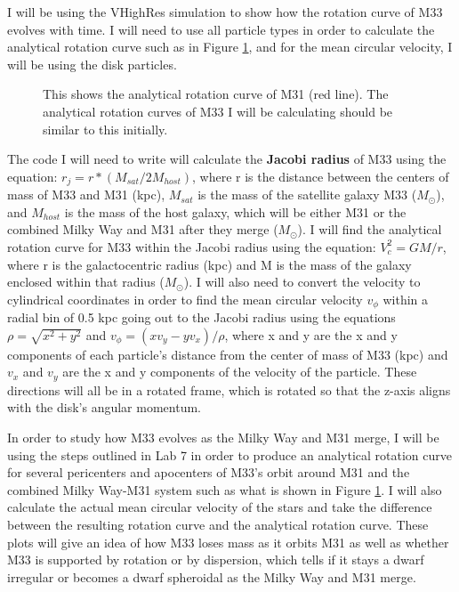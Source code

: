 \documentclass[trackchanges, twocolumn]{aastex7}
\begin{document}
I will be using the VHighRes simulation to show how the rotation curve of M33 evolves with time. I will need to use all particle types in order to calculate the analytical rotation curve such as in Figure \ref{fig:Lab7}, and for the mean circular velocity, I will be using the disk particles.

\begin{figure}[ht!]
\caption{ This shows the analytical rotation curve of M31 (red line). The analytical rotation curves of M33 I will be calculating should be similar to this initially.
\label{fig:Lab7}}
\end{figure}

The code I will need to write will calculate the \textbf{Jacobi radius} of M33 using the equation: 
\(r_j = r*(M_{sat}/2M_{host})\),
where r is the distance between the centers of mass of M33 and M31 (kpc), \(M_{sat}\) is the mass of the satellite galaxy M33 (\(M_\odot\)), and \(M_{host}\) is the mass of the host galaxy, which will be either M31 or the combined Milky Way and M31 after they merge (\(M_\odot\)). I will find the analytical rotation curve for M33 within the Jacobi radius using the equation:
\(V_c^2=GM/r\),
where r is the galactocentric radius (kpc) and M is the mass of the galaxy enclosed within that radius (\(M_\odot\)). I will also need to convert the velocity to cylindrical coordinates in order to find the mean circular velocity \(v_\phi\) within a radial bin of 0.5 kpc going out to the Jacobi radius using the equations \(\rho=\sqrt{x^2+y^2}\) and \(v_\phi=(xv_y-yv_x)/\rho\), where x and y are the x and y components of each particle's distance from the center of mass of M33 (kpc) and \(v_x\) and \(v_y\) are the x and y components of the velocity of the particle. These directions will all be in a rotated frame, which is rotated so that the z-axis aligns with the disk's angular momentum.

In order to study how M33 evolves as the Milky Way and M31 merge, I will be using the steps outlined in Lab 7 in order to produce an analytical rotation curve for several pericenters and apocenters of M33's orbit around M31 and the combined Milky Way-M31 system such as what is shown in Figure \ref{fig:Lab7}. I will also calculate the actual mean circular velocity of the stars and take the difference between the resulting rotation curve and the analytical rotation curve. These plots will give an idea of how M33 loses mass as it orbits M31 as well as whether M33 is supported by rotation or by dispersion, which tells if it stays a dwarf irregular or becomes a dwarf spheroidal as the Milky Way and M31 merge.
\end{document}
